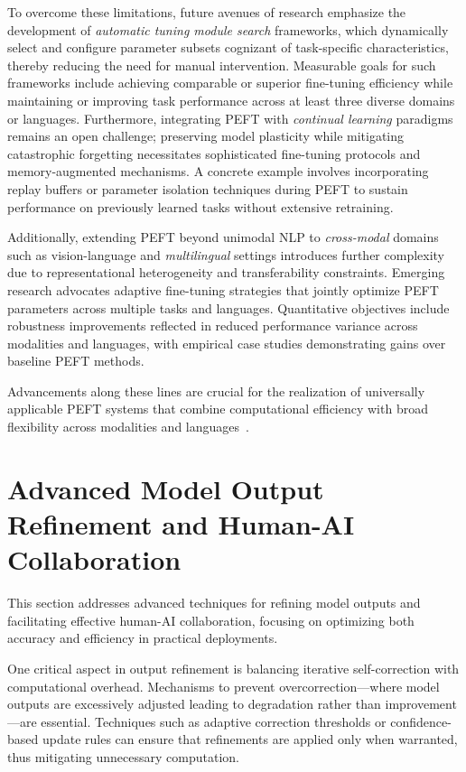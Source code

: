\documentclass[sigconf]{acmart}
\begin{document}
To overcome these limitations, future avenues of research emphasize the development of \textit{automatic tuning module search} frameworks, which dynamically select and configure parameter subsets cognizant of task-specific characteristics, thereby reducing the need for manual intervention. Measurable goals for such frameworks include achieving comparable or superior fine-tuning efficiency while maintaining or improving task performance across at least three diverse domains or languages. Furthermore, integrating PEFT with \textit{continual learning} paradigms remains an open challenge; preserving model plasticity while mitigating catastrophic forgetting necessitates sophisticated fine-tuning protocols and memory-augmented mechanisms. A concrete example involves incorporating replay buffers or parameter isolation techniques during PEFT to sustain performance on previously learned tasks without extensive retraining.

Additionally, extending PEFT beyond unimodal NLP to \textit{cross-modal} domains such as vision-language and \textit{multilingual} settings introduces further complexity due to representational heterogeneity and transferability constraints. Emerging research advocates adaptive fine-tuning strategies that jointly optimize PEFT parameters across multiple tasks and languages. Quantitative objectives include robustness improvements reflected in reduced performance variance across modalities and languages, with empirical case studies demonstrating gains over baseline PEFT methods.

Advancements along these lines are crucial for the realization of universally applicable PEFT systems that combine computational efficiency with broad flexibility across modalities and languages~\cite{ref48}.

\section{Advanced Model Output Refinement and Human-AI Collaboration}

This section addresses advanced techniques for refining model outputs and facilitating effective human-AI collaboration, focusing on optimizing both accuracy and efficiency in practical deployments.

One critical aspect in output refinement is balancing iterative self-correction with computational overhead. Mechanisms to prevent overcorrection—where model outputs are excessively adjusted leading to degradation rather than improvement—are essential. Techniques such as adaptive correction thresholds or confidence-based update rules can ensure that refinements are applied only when warranted, thus mitigating unnecessary computation.
\end{document}
